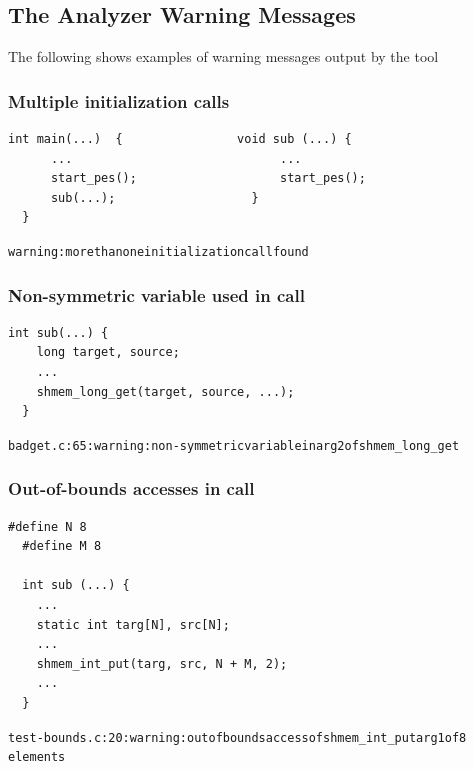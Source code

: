 \subsection{The \openshmem Analyzer Warning Messages}

The following shows examples of warning messages output by the tool

\begin{minipage}{\linewidth}
\subsubsection{Multiple \openshmem initialization calls}

\begin{lstlisting}[language=OSH+C]
  int main(...)  {                void sub (...) {
      ...                             ...
      start_pes();                    start_pes();       
      sub(...);                   } 
  }
\end{lstlisting}
\begin{alltt}
  warning: more than one \openshmem initialization call found
\end{alltt}
\end{minipage}

\begin{minipage}{\linewidth}
\subsubsection{Non-symmetric variable used in \openshmem call}

\begin{lstlisting}[language=OSH+C]
  int sub(...) {
    long target, source;
    ...
    shmem_long_get(target, source, ...);
  }
\end{lstlisting}
\begin{alltt}
  badget.c:65: warning: non-symmetric variable in arg2 of shmem_long_get
\end{alltt}
\end{minipage}

\begin{minipage}{\linewidth}
\subsubsection{Out-of-bounds accesses in \openshmem call}

\begin{lstlisting}[language=OSH+C]
  #define N 8
  #define M 8

  int sub (...) {
    ...
    static int targ[N], src[N];
    ...
    shmem_int_put(targ, src, N + M, 2);
    ...
  }
\end{lstlisting}
\begin{alltt}
  test-bounds.c:20: warning: out of bounds access of shmem_int_put arg1 of 8
  elements
\end{alltt}
\end{minipage}

